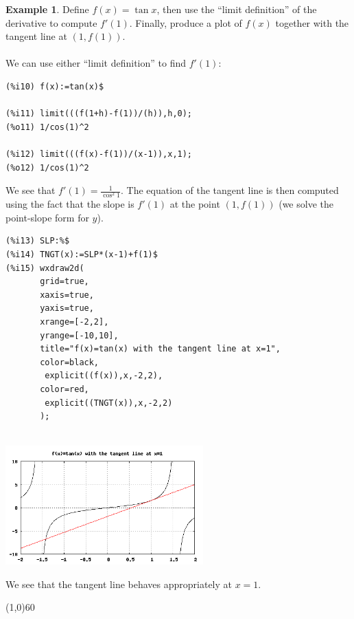 \documentclass[10.5pt,twoside]{report}
\theoremstyle{definition}
\newtheorem{exmp}{Example}[section]
\begin{document}
\begin{exmp}  Define $f(x)=\tan{x}$, then use the ``limit definition'' of the derivative to compute $f'(1)$.  Finally, produce a plot of $f(x)$ together with the tangent line at $(1,f(1))$.\\
${}$\\

We can use either ``limit definition'' to find $f'(1)$:

\begin{verbatim}
(%i10) f(x):=tan(x)$

(%i11) limit(((f(1+h)-f(1))/(h)),h,0);
(%o11) 1/cos(1)^2

(%i12) limit(((f(x)-f(1))/(x-1)),x,1);
(%o12) 1/cos(1)^2
\end{verbatim}

We see that $f'(1)=\frac{1}{\cos^2{1}}$.  The equation of the tangent line is then computed using the fact that the slope is $f'(1)$ at the point $(1,f(1))$ (we solve the point-slope form for $y$).

\begin{verbatim}
(%i13) SLP:%$
(%i14) TNGT(x):=SLP*(x-1)+f(1)$
(%i15) wxdraw2d(
       grid=true,
       xaxis=true,
       yaxis=true,
       xrange=[-2,2],
       yrange=[-10,10],
       title="f(x)=tan(x) with the tangent line at x=1",
       color=black,
        explicit((f(x)),x,-2,2),
       color=red,
        explicit((TNGT(x)),x,-2,2)
       );
       
\end{verbatim}

\includegraphics[width=3in]{example_4_1_3}


We see that the tangent line behaves appropriately at $x=1$.

\end{exmp}

\line(1,0){60}
\linethickness{0.5mm}
\end{document}
